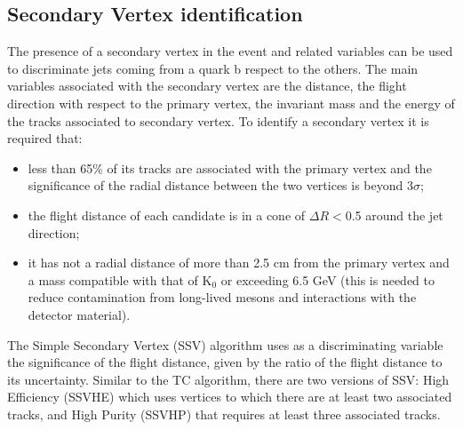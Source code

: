\subsection*{Secondary Vertex identification}
The presence of a
secondary vertex in the event and related variables  can be used
to discriminate jets coming from a quark b respect to the others. The main variables associated with the secondary vertex are the distance, the flight direction
with respect to the primary vertex, the invariant mass and the energy of the tracks associated to 
secondary vertex. To identify a secondary vertex it is required that:
\begin{itemize}
\item less than 65\% of its tracks are associated with the primary vertex and
the significance of the radial distance between the two vertices is beyond 3$\sigma$;
\item the flight distance of each candidate is in a cone of $\Delta R <$0.5 around
the jet direction;
\item it has not a radial distance of more than 2.5 cm from the primary vertex and a mass compatible with
that of K$_0$ or exceeding 6.5 GeV (this is needed to reduce contamination from long-lived mesons and interactions with the detector material).
\end{itemize}
The Simple Secondary Vertex (SSV) algorithm uses as a discriminating variable 
the significance of the flight distance, given by the ratio of the flight distance to its uncertainty. 
Similar to the TC algorithm, there are two versions
of SSV: High Efficiency (SSVHE) which uses vertices to which there are at least
two associated tracks, and High Purity (SSVHP) that requires at least three associated tracks.

